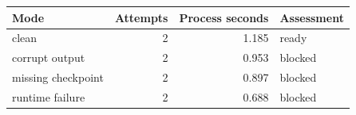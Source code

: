 \begin{tabular}{lrrl}
\toprule Mode & Attempts & Process seconds & Assessment \\
\midrule
clean & 2 & 1.185 & ready \\
corrupt output & 2 & 0.953 & blocked \\
missing checkpoint & 2 & 0.897 & blocked \\
runtime failure & 2 & 0.688 & blocked \\
\bottomrule
\end{tabular}
